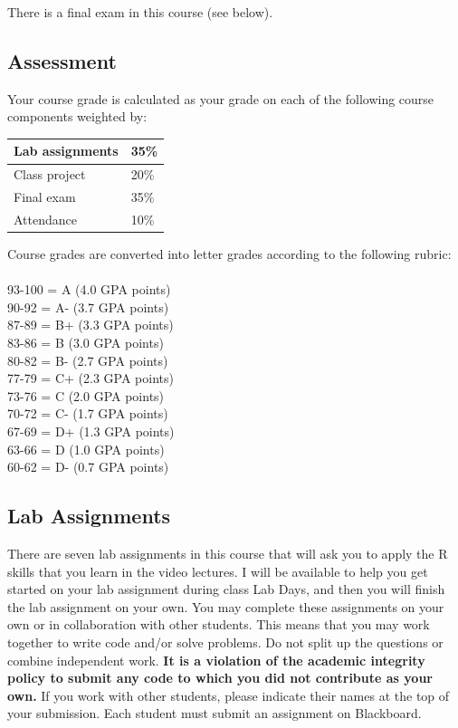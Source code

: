 \documentclass[12pt,letterpaper]{article}
\begin{document}
There is a final exam in this course (see below).

\subsection*{Assessment}

Your course grade is calculated as your grade on each of the
following course components weighted by:

\begin{tabular}{l|l}
  Lab assignments & 35\% \\
  \hline
  Class project & 20\% \\
  \hline
  Final exam & 35\% \\
  \hline
  Attendance & 10\%
\end{tabular}
\newpage
Course grades are converted into letter grades according to the
following rubric:\\
\\
93-100 = A (4.0 GPA points)\\
90-92 = A- (3.7 GPA points)\\
87-89 = B+ (3.3 GPA points)\\
83-86 = B (3.0 GPA points)\\
80-82 = B- (2.7 GPA points)\\
77-79 = C+ (2.3 GPA points)\\
73-76 = C (2.0 GPA points)\\
70-72 = C- (1.7 GPA points)\\
67-69 = D+ (1.3 GPA points)\\
63-66 = D (1.0 GPA points) \\
60-62 = D- (0.7 GPA points)

\subsection*{Lab Assignments}

There are seven lab assignments in this course that will ask you to
apply the R skills that you learn in the video lectures. I will be
available to help you get started on your lab assignment during class
Lab Days, and then you will finish the lab assignment on your own.
You may complete these assignments on your own or in collaboration
with other students. This means that you may work together to write
code and/or solve problems. Do not split up the questions or combine
independent work. \textbf{It is a violation of the academic integrity
  policy to submit any code to which you did not contribute as your
own.} If you work with other students, please indicate their names at
the top of your submission. Each student must submit an assignment on
Blackboard. \par
\end{document}
